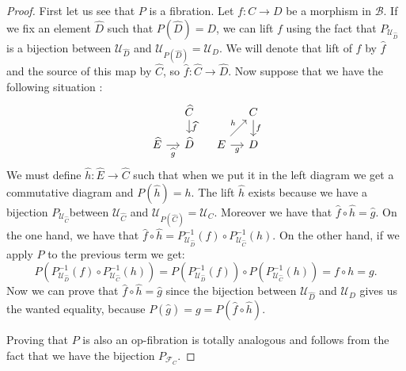 \documentclass[12pt,reqno]{amsart}
\theoremstyle{definition}
\theoremstyle{remark}
\numberwithin{figure}{section}%
\newcommand{\Ba}{\mathcal{B}}
\begin{document}
\begin{proof}
    First let us see that $P$ is a fibration. Let $f \colon C \rightarrow D$ be a morphism in $\Ba$.  If we fix an element $\widehat{D}$ such that $P(\widehat{D})=D$, we can lift $f$ using the fact that $P_{\mathcal{U}_{\widehat{D}}}$ is a bijection between $\mathcal{U}_{\widehat{D}}$ and $\mathcal{U}_{P(\widehat{D})}=\mathcal{U}_D$. We will denote that lift of $f$ by $\widehat{f}$ and the source of this map by $\widehat{C}$, so $\widehat{f} \colon \widehat{C} \rightarrow \widehat{D}$.  Now suppose that we have the following situation :
    $$
\begin{tikzcd}[column sep=12pt, row sep=12pt] 
& \widehat{C} \arrow[d, "\widehat{f}"] &                                 & C \arrow[d, "f"] \\
\widehat{E} \arrow[r, "\widehat{g}"'] &\widehat{D}                    & E \arrow[r, "g"'] \arrow[ru, "h"] & D               
\end{tikzcd}
    $$
    We must define $\widehat{h} \colon\widehat{E} \rightarrow\widehat{C}$ such that when we put it in the left diagram we get a commutative diagram and $P(\widehat{h})=h$. The lift $\widehat{h}$ exists because we have a bijection $P_{\mathcal{U}_{\widehat{C}}}$between $\mathcal{U}_{\widehat{C}}$ and $\mathcal{U}_{P(\widehat{C})}=\mathcal{U}_C$. Moreover we have that $\widehat{f} \circ \widehat{h}= \widehat{g}$. On the one hand, we have that $\widehat{f} \circ \widehat{h}= P^{-1}_{\mathcal{U}_{\widehat{D}}}(f) \circ P^{-1}_{\mathcal{U}_{\widehat{C}}}(h)$. On the other hand, if we apply $P$ to the previous term we get:
    $$P(P^{-1}_{\mathcal{U}_{\widehat{D}}}(f) \circ P^{-1}_{\mathcal{U}_{\widehat{C}}}(h))=P(P^{-1}_{\mathcal{U}_{\widehat{D}}}(f)) \circ P(P^{-1}_{\mathcal{U}_{\widehat{C}}}(h))=f \circ h= g.$$ Now we can prove that $\hat{f} \circ \widehat{h}=\widehat{g}$ since the bijection between $\mathcal{U}_{\widehat{D}}$ and $\mathcal{U}_D$ gives us the wanted equality, because $P(\widehat{g})=g=P(\widehat{f} \circ \widehat{h})$.

    Proving that $P$ is also an op-fibration is totally analogous and follows from the fact that we have the bijection $P_{\mathcal{F}_C}$.
\end{proof}
\end{document}
